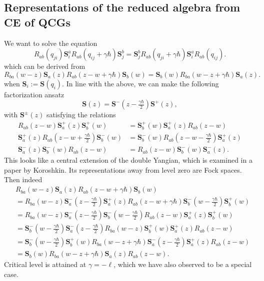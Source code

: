 \documentclass[11pt]{report}
\theoremstyle{definition}
\theoremstyle{remark}
\theoremstyle{remark}
\begin{document}
\subsection{Representations of the reduced algebra from CE of QCGs}

We want to solve the equation
\begin{equation*}
R_{ab}(q_{ji}) \mathbf{S}_i^a R_{ab}(q_{ij}+\gamma\hbar) \mathbf{S}_j^b = \mathbf{S}_j^b R_{ab}(q_{ji}+\gamma\hbar) \mathbf{S}_i^a R_{ab}(q_{ij}).
\end{equation*}
which can be derived from
\begin{equation*}
R_{ba}(w-z) \mathbf{S}_a(z) R_{ab}(z-w+\gamma\hbar) \mathbf{S}_b(w) = \mathbf{S}_b(w) R_{ba}(w-z+\gamma\hbar) \mathbf{S}_a(z).
\end{equation*}
when $\mathbf{S}_i := \mathbf{S}(q_i)$. In line with the above, we can make the following factorization ansatz
\begin{equation*}
\mathbf{S}(z) = \mathbf{S}^-(z-\tfrac{\gamma\hbar}{2}) \mathbf{S}^+(z),
\end{equation*}
with $\mathbf{S}^\pm(z)$ satisfying the relations
\begin{align*}
R_{ab}(z-w) \mathbf{S}_a^+(z) \mathbf{S}_b^+(w) &= \mathbf{S}_b^+(w) \mathbf{S}_a^+(z) R_{ab}(z-w) \\
\mathbf{S}_a^+(z) R_{ab}(z-w+\tfrac{\gamma\hbar}{2}) \mathbf{S}_b^-(w) &= \mathbf{S}_b^-(w) R_{ab}(z-w-\tfrac{\gamma\hbar}{2}) \mathbf{S}_a^+(z) \\
\mathbf{S}_a^-(z) \mathbf{S}_b^-(w) R_{ab}(z-w) &= R_{ab}(z-w) \mathbf{S}_b^-(w) \mathbf{S}_a^-(z).
\end{align*}
This looks like a central extension of the double Yangian, which is examined in a paper by Koroshkin. Its representations away from level zero are Fock spaces. Then indeed
\begin{align*}
&R_{ba}(w-z) \mathbf{S}_a(z) R_{ab}(z-w+\gamma\hbar) \mathbf{S}_b(w) \\
&= R_{ba}(w-z) \mathbf{S}_a^-(z-\tfrac{\gamma\hbar}{2}) \mathbf{S}_a^+(z) R_{ab}(z-w+\gamma\hbar) \mathbf{S}_b^-(w-\tfrac{\gamma\hbar}{2}) \mathbf{S}_b^+(w) \\
&= R_{ba}(w-z) \mathbf{S}_a^-(z-\tfrac{\gamma\hbar}{2}) \mathbf{S}_b^-(w-\tfrac{\gamma\hbar}{2}) R_{ab}(z-w) \mathbf{S}_a^+(z) \mathbf{S}_b^+(w) \\
&= \mathbf{S}_b^-(w-\tfrac{\gamma\hbar}{2}) \mathbf{S}_a^-(z-\tfrac{\gamma\hbar}{2}) R_{ba}(w-z) \mathbf{S}_b^+(w) \mathbf{S}_a^+(z) R_{ab}(z-w) \\
&= \mathbf{S}_b^-(w-\tfrac{\gamma\hbar}{2}) \mathbf{S}_b^+(w) R_{ba}(w-z+\gamma\hbar) \mathbf{S}_a^-(z-\tfrac{\gamma\hbar}{2}) \mathbf{S}_a^+(z) R_{ab}(z-w) \\
&= \mathbf{S}_b(w) R_{ba}(w-z+\gamma\hbar) \mathbf{S}_a(z) R_{ab}(z-w).
\end{align*}
Critical level is attained at $\gamma = -\ell$, which we have also observed to be a special case.
\end{document}
